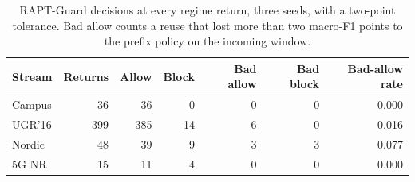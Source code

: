 \begin{table}[t]
\caption{RAPT-Guard decisions at every regime return, three seeds, with a two-point tolerance. Bad allow counts a reuse that lost more than two macro-F1 points to the prefix policy on the incoming window.}
\label{tab:gate}
\centering
\footnotesize
\begin{tabular}{@{}lrrrrrr@{}}
\toprule
\textbf{Stream} & \textbf{Returns} & \textbf{Allow} & \textbf{Block} & \textbf{Bad allow} & \textbf{Bad block} & \textbf{Bad-allow rate}\\
\midrule
Campus & 36 & 36 & 0 & 0 & 0 & 0.000 \\
UGR'16 & 399 & 385 & 14 & 6 & 0 & 0.016 \\
Nordic & 48 & 39 & 9 & 3 & 3 & 0.077 \\
5G NR & 15 & 11 & 4 & 0 & 0 & 0.000 \\
\bottomrule
\end{tabular}
\end{table}
